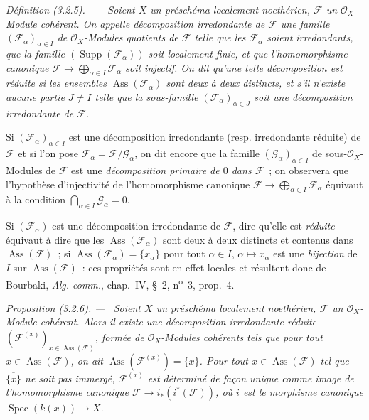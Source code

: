 \documentclass[10pt,oneside]{book}
\newenvironment{definition}[1][]{%
  \par\medskip\noindent\itshape Définition (#1). ---\ }{\par}
\newenvironment{proposition}[1][]{%
  \par\medskip\noindent\itshape Proposition (#1). ---\ }{\par}
\begin{document}
\begin{definition}[3.2.5]
\label{IV.2.3.2.5-fr}
Soient $X$ un préschéma localement noethérien, $\mathcal F$ un
$\mathcal O_X$-Module cohérent. On appelle \emph{décomposition irredondante de
$\mathcal F$} une famille $(\mathcal F_\alpha)_{\alpha\in I}$ de
$\mathcal O_X$-Modules quotients de $\mathcal F$ telle que les
$\mathcal F_\alpha$ soient irredondants, que la famille
$(\operatorname{Supp}(\mathcal F_\alpha))$ soit localement finie, et que
l'homomorphisme canonique
$\mathcal F\to\bigoplus_{\alpha\in I}\mathcal F_\alpha$ soit injectif. On dit
qu'une telle décomposition est \emph{réduite} si les ensembles
$\operatorname{Ass}(\mathcal F_\alpha)$ sont deux à deux distincts, et s'il
n'existe aucune partie $J\ne I$ telle que la sous-famille
$(\mathcal F_\alpha)_{\alpha\in J}$ soit une décomposition irredondante de
$\mathcal F$.
\end{definition}

Si $(\mathcal F_\alpha)_{\alpha\in I}$ est une décomposition irredondante
(resp. irredondante réduite) de $\mathcal F$ et si l'on pose
$\mathcal F_\alpha=\mathcal F/\mathcal G_\alpha$, on dit encore que la
famille $(\mathcal G_\alpha)_{\alpha\in I}$ de sous-$\mathcal O_X$-Modules de
$\mathcal F$ est une \emph{décomposition primaire de $0$ dans $\mathcal F$}~;
on observera que l'hypothèse d'injectivité de l'homomorphisme canonique
$\mathcal F\to\bigoplus_{\alpha\in I}\mathcal F_\alpha$ équivaut à la
condition $\bigcap_{\alpha\in I}\mathcal G_\alpha=0$.

Si $(\mathcal F_\alpha)$ est une décomposition irredondante de $\mathcal F$,
dire qu'elle est \emph{réduite} équivaut à dire que les
$\operatorname{Ass}(\mathcal F_\alpha)$ sont deux à deux distincts et contenus
dans $\operatorname{Ass}(\mathcal F)$~; si
$\operatorname{Ass}(\mathcal F_\alpha)=\{x_\alpha\}$ pour tout $\alpha\in I$,
$\alpha\mapsto x_\alpha$ est une \emph{bijection} de $I$ sur
$\operatorname{Ass}(\mathcal F)$~: ces propriétés sont en effet locales et
résultent donc de Bourbaki, \emph{Alg. comm.}, chap.~IV, \S~2,
n\textsuperscript{o}~3, prop.~4.

\begin{proposition}[3.2.6]
\label{IV.2.3.2.6-fr}
Soient $X$ un préschéma localement noethérien, $\mathcal F$ un
$\mathcal O_X$-Module cohérent. Alors il existe une décomposition irredondante
réduite $(\mathcal F^{(x)})_{x\in\operatorname{Ass}(\mathcal F)}$, formée de
$\mathcal O_X$-Modules cohérents tels que pour tout
$x\in\operatorname{Ass}(\mathcal F)$, on ait
$\operatorname{Ass}(\mathcal F^{(x)})=\{x\}$. Pour tout
$x\in\operatorname{Ass}(\mathcal F)$ tel que $\overline{\{x\}}$ ne soit pas
immergé, $\mathcal F^{(x)}$ est déterminé de façon unique comme image de
l'homomorphisme canonique $\mathcal F\to i_*(i^*(\mathcal F))$, où $i$ est le
morphisme canonique $\operatorname{Spec}(k(x))\to X$.
\end{proposition}
\end{document}
